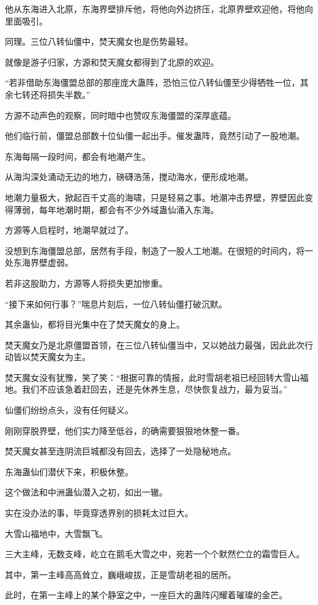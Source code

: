 \begin{this_body}
他从东海进入北原，东海界壁排斥他，将他向外边挤压，北原界壁欢迎他，将他向里面吸引。

同理。三位八转仙僵中，焚天魔女也是伤势最轻。

就像是游子归家，方源和焚天魔女都得到了北原的欢迎。

“若非借助东海僵盟总部的那座庞大蛊阵，恐怕三位八转仙僵至少得牺牲一位，其余七转还将损失半数。”

方源不动声色的观察，同时暗中也赞叹东海僵盟的深厚底蕴。

他们临行前，僵盟总部数十位仙僵一起出手。催发蛊阵，竟然引动了一股地潮。

东海每隔一段时间，都会有地潮产生。

从海沟深处涌动无边的地力，磅礴浩荡，搅动海水，便形成地潮。

地潮力量极大，掀起百千丈高的海啸，只是轻易之事。地潮冲击界壁，界壁因此变得薄弱，每年地潮时期，都会有不少外域蛊仙涌入东海。

方源等人启程时，地潮早就过了。

没想到东海僵盟总部，居然有手段，制造了一股人工地潮。在很短的时间内，将一处东海界壁虚弱。

若非这股助力，方源等人将损失更加惨重。

“接下来如何行事？”喘息片刻后，一位八转仙僵打破沉默。

其余蛊仙，都将目光集中在了焚天魔女的身上。

焚天魔女乃是北原僵盟首领，在三位八转仙僵当中，又以她战力最强，因此此次行动皆以焚天魔女为主。

焚天魔女没有犹豫，笑了笑：“根据可靠的情报，此时雪胡老祖已经回转大雪山福地。我们不应该急着赶回去，还是先休养生息，尽快恢复战力，最为妥当。”

仙僵们纷纷点头，没有任何疑义。

刚刚穿脱界壁，他们实力降至低谷，的确需要狠狠地休整一番。

焚天魔女甚至连阴流巨城都没有回去，选择了一处隐秘地点。

东海蛊仙们潜伏下来，积极休整。

这个做法和中洲蛊仙潜入之初，如出一辙。

实在没办法的事，毕竟穿透界别的损耗太过巨大。

大雪山福地中，大雪飘飞。

三大主峰，无数支峰，屹立在鹅毛大雪之中，宛若一个个默然伫立的霜雪巨人。

其中，第一主峰高高耸立，巍峨峻拔，正是雪胡老祖的居所。

此时，在第一主峰上的某个静室之中，一座巨大的蛊阵闪耀着璀璨的金芒。


\end{this_body}
